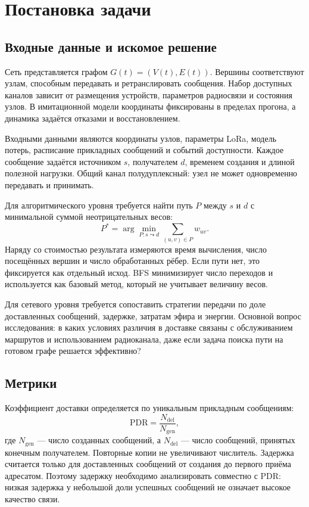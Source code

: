 \section{Постановка задачи}

\subsection{Входные данные и искомое решение}

Сеть представляется графом $G(t)=(V(t),E(t))$. Вершины соответствуют узлам, способным передавать и ретранслировать сообщения. Набор доступных каналов зависит от размещения устройств, параметров радиосвязи и состояния узлов. В имитационной модели координаты фиксированы в пределах прогона, а динамика задаётся отказами и восстановлением.

Входными данными являются координаты узлов, параметры LoRa, модель потерь, расписание прикладных сообщений и событий доступности. Каждое сообщение задаётся источником $s$, получателем $d$, временем создания и длиной полезной нагрузки. Общий канал полудуплексный: узел не может одновременно передавать и принимать.

Для алгоритмического уровня требуется найти путь $P$ между $s$ и $d$ с минимальной суммой неотрицательных весов:
\begin{equation}
  P^*=\arg\min_{P:s\leadsto d}\sum_{(u,v)\in P}w_{uv}.
  \label{eq:path}
\end{equation}
Наряду со стоимостью результата измеряются время вычисления, число посещённых вершин и число обработанных рёбер. Если пути нет, это фиксируется как отдельный исход. BFS минимизирует число переходов и используется как базовый метод, который не учитывает величину весов.

Для сетевого уровня требуется сопоставить стратегии передачи по доле доставленных сообщений, задержке, затратам эфира и энергии. Основной вопрос исследования: в каких условиях различия в доставке связаны с обслуживанием маршрутов и использованием радиоканала, даже если задача поиска пути на готовом графе решается эффективно?

\subsection{Метрики}

Коэффициент доставки определяется по уникальным прикладным сообщениям:
\begin{equation}
  \mathrm{PDR}=\frac{N_{\mathrm{del}}}{N_{\mathrm{gen}}},
\end{equation}
где $N_{\mathrm{gen}}$ --- число созданных сообщений, а $N_{\mathrm{del}}$ --- число сообщений, принятых конечным получателем. Повторные копии не увеличивают числитель. Задержка считается только для доставленных сообщений от создания до первого приёма адресатом. Поэтому задержку необходимо анализировать совместно с PDR: низкая задержка у небольшой доли успешных сообщений не означает высокое качество связи.

